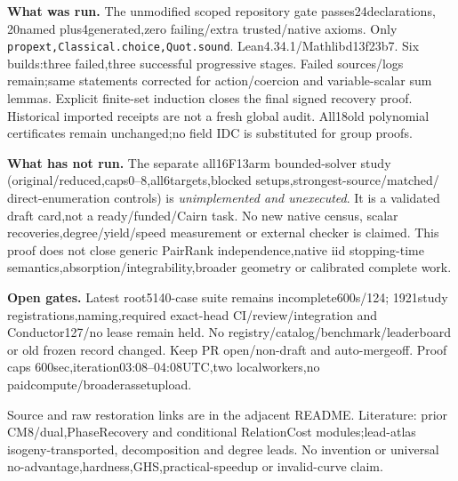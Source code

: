 \documentclass[10pt]{article}
\begin{document}
\textbf{What was run.} The unmodified scoped repository gate passes24declarations,
20named plus4generated,zero failing/extra trusted/native axioms. Only
\texttt{propext,Classical.choice,Quot.sound}. Lean4.34.1/Mathlibd13f23b7.
Six builds:three failed,three successful progressive stages. Failed sources/logs
remain;same statements corrected for action/coercion and variable-scalar sum
lemmas. Explicit finite-set induction closes the final signed recovery proof.
Historical imported receipts are not a fresh global audit. All18old polynomial
certificates remain unchanged;no field IDC is substituted for group proofs.

\textbf{What has not run.} The separate all16F13arm bounded-solver study
(original/reduced,caps0--8,all6targets,blocked setups,strongest-source/matched/
direct-enumeration controls) is \emph{unimplemented and unexecuted}.
It is a validated draft card,not a ready/funded/Cairn task. No new native census,
scalar recoveries,degree/yield/speed measurement or external checker is claimed.
This proof does not close generic PairRank independence,native iid stopping-time
semantics,absorption/integrability,broader geometry or calibrated complete work.

\textbf{Open gates.} Latest root5140-case suite remains incomplete600s/124;
1921study registrations,naming,required exact-head CI/review/integration and
Conductor127/no lease remain held. No registry/catalog/benchmark/leaderboard or
old frozen record changed. Keep PR open/non-draft and auto-mergeoff. Proof caps
600sec,iteration03:08--04:08UTC,two localworkers,no paidcompute/broaderassetupload.

\small Source and raw restoration links are in the adjacent README. Literature:
prior CM8/dual,PhaseRecovery and conditional RelationCost modules;lead-atlas
\linebreak isogeny-transported, decomposition and degree leads. No invention or universal
no-advantage,hardness,GHS,practical-speedup or invalid-curve claim.
\end{document}
